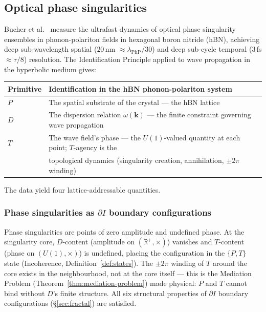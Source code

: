 \documentclass[11pt,a4paper]{article}
\theoremstyle{definition}
\theoremstyle{remark}
\newcommand{\R}{\mathbb{R}}
\begin{document}
\subsection{Optical phase singularities}\label{subsec:optical-singularities}

Bucher et al.~\cite{Bucher2025} measure the ultrafast dynamics of optical phase singularity ensembles in phonon-polariton fields in hexagonal boron nitride (hBN), achieving deep sub-wavelength spatial ($20$\,nm $\approx \lambda_{\mathrm{PhP}}/30$) and deep sub-cycle temporal ($3$\,fs $\approx \tau/8$) resolution. The Identification Principle applied to wave propagation in the hyperbolic medium gives:
\begin{center}
\begin{tabular}{@{}l l@{}}
\toprule
Primitive & Identification in the hBN phonon-polariton system\\
\midrule
$P$ & The spatial substrate of the crystal --- the hBN lattice\\
$D$ & The dispersion relation $\omega(\mathbf{k})$ --- the finite constraint governing wave propagation\\
$T$ & The wave field's phase --- the $U(1)$-valued quantity at each point; $T$-agency is the\\
    & topological dynamics (singularity creation, annihilation, $\pm 2\pi$ winding)\\
\bottomrule
\end{tabular}
\end{center}
The data yield four lattice-addressable quantities.

\subsubsection*{Phase singularities as $\partial I$ boundary configurations}

Phase singularities are points of zero amplitude and undefined phase. At the singularity core, $D$-content (amplitude on $(\R^{+},\times)$) vanishes and $T$-content (phase on $(U(1),\times)$) is undefined, placing the configuration in the $\{P,T\}$ state (Incoherence, Definition~\ref{def:states}). The $\pm 2\pi$ winding of $T$ around the core exists in the neighbourhood, not at the core itself --- this is the Mediation Problem (Theorem~\ref{thm:mediation-problem}) made physical: $P$ and $T$ cannot bind without $D$'s finite structure. All six structural properties of $\partial I$ boundary configurations (\S\ref{sec:fractal}) are satisfied.
\end{document}
